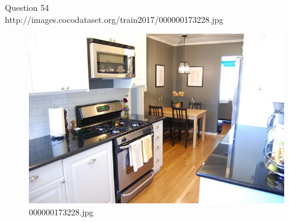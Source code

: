 Question 54\\
http://images.cocodataset.org/train2017/000000173228.jpg
\begin{figure}[h]
    \centering
    \includegraphics[width=0.8\linewidth]{../image set/hard/000000173228.jpg}
    \caption{000000173228.jpg}
\end{figure}
